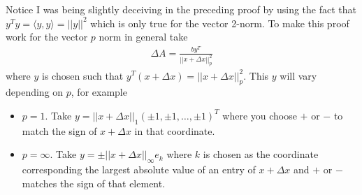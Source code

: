 \documentclass[10pt,a4paper]{article}
\theoremstyle{definition}
\theoremstyle{definition}
\numberwithin{equation}{section}
\begin{document}
Notice I was being slightly deceiving in the preceding proof by using the fact that $y^T y = \langle y, y \rangle = ||y||^2$ which is only true for the vector 2-norm. To make this proof work for the vector $p$ norm in general take
\begin{align*}
\Delta A = \frac{by^T}{||x + \Delta x||_p^2}
\end{align*}
where $y$ is chosen such that $y^T (x + \Delta x) = ||x + \Delta x||_p^2$. This $y$ will vary depending on $p$, for example
\begin{itemize}
\item $p = 1$. Take $y = ||x + \Delta x||_1 (\pm 1, \pm 1, \ldots, \pm 1)^T$ where you choose $+$ or $-$ to match the sign of $x + \Delta x$ in that coordinate. 
\item $p = \infty$. Take $y = \pm ||x + \Delta x||_\infty e_k$ where $k$ is chosen as the coordinate corresponding the largest absolute value of an entry of $x + \Delta x$ and $+$ or $-$ matches the sign of that element. 
\end{itemize}
\end{document}
